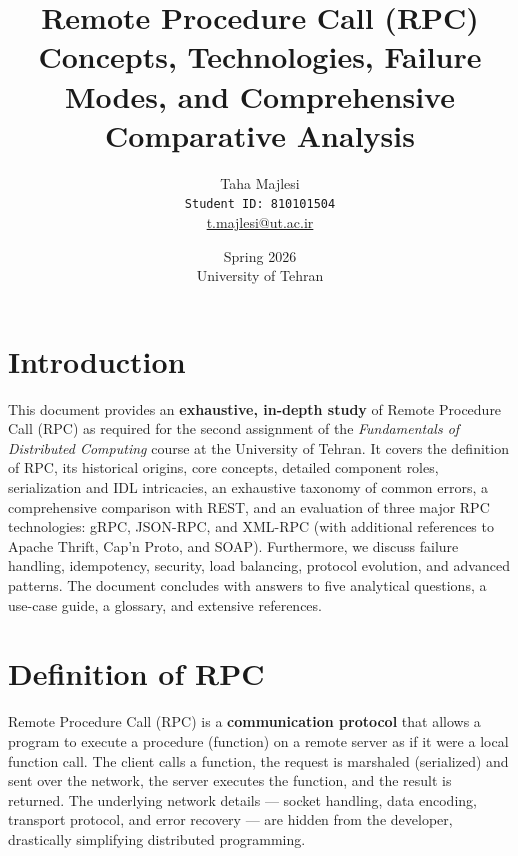 \documentclass[10pt,a4paper]{article}
\title{\textbf{Remote Procedure Call (RPC)} \\[0.5cm] \large Concepts, Technologies, Failure Modes, and Comprehensive Comparative Analysis}
\author{Taha Majlesi \\ \texttt{Student ID: 810101504} \\ \href{mailto:t.majlesi@ut.ac.ir}{t.majlesi@ut.ac.ir}}
\date{Spring 2026 \\ University of Tehran}
\begin{document}
\maketitle
\tableofcontents
\newpage

\section{Introduction}
This document provides an \textbf{exhaustive, in-depth study} of Remote Procedure Call (RPC) as required for the second assignment of the \textit{Fundamentals of Distributed Computing} course at the University of Tehran. 
It covers the definition of RPC, its historical origins, core concepts, detailed component roles, serialization and IDL intricacies, an exhaustive taxonomy of common errors, a comprehensive comparison with REST, and an evaluation of three major RPC technologies: gRPC, JSON-RPC, and XML-RPC (with additional references to Apache Thrift, Cap’n Proto, and SOAP). 
Furthermore, we discuss failure handling, idempotency, security, load balancing, protocol evolution, and advanced patterns. The document concludes with answers to five analytical questions, a use-case guide, a glossary, and extensive references.











































\section{Definition of RPC}
Remote Procedure Call (RPC) is a \textbf{communication protocol} that allows a program to execute a procedure (function) on a remote server as if it were a local function call. 
The client calls a function, the request is marshaled (serialized) and sent over the network, the server executes the function, and the result is returned. 
The underlying network details — socket handling, data encoding, transport protocol, and error recovery — are hidden from the developer, drastically simplifying distributed programming.
\end{document}
